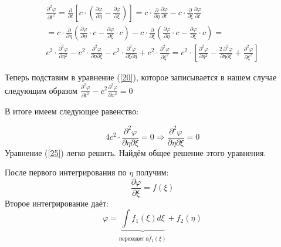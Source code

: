 \documentclass[14pt,a4paper,oneside]{extarticle}	%
\begin{document}
 \begin{eqnarray*}
\frac{\partial^{2} \varphi}{\partial t^{2}} = \frac{\partial}{\partial t}\left[ c \cdot \left( \frac{\partial \varphi}{\partial \eta} - \frac{\partial \varphi}{\partial \xi} \right)\right]  = c \cdot \frac{\partial }{\partial \eta}\frac{\partial \varphi}{\partial t} - c\cdot \frac{\partial}{\partial \xi}\frac{\partial \varphi}{\partial t} \\
= c\cdot \frac{\partial }{\partial \eta} \left( \frac{\partial \varphi}{\partial \eta}\cdot c -  \frac{\partial \varphi}{\partial \xi}\cdot c \right) - c\cdot \frac{\partial }{\partial \xi} \left( \frac{\partial \varphi}{\partial \eta}\cdot c - \frac{\partial \varphi}{\partial \xi} \cdot c \right) = \\
c^{2}\cdot\frac{\partial^{2} \varphi}{\partial \eta^{2}} - c^{2}\cdot \frac{\partial^{2} \varphi}{\partial \eta \partial \xi} - c^{2}\cdot \frac{\partial^{2} \varphi}{\partial \xi \partial \eta} + c^{2}\cdot \frac{\partial^{2} \varphi}{\partial \xi^{2}} = 
c^{2}\cdot \left[ \frac{\partial^{2} \varphi}{\partial \eta^{2}} - \frac{2\:\partial^{2} \varphi}{\partial \eta \partial \xi} +  \frac{\partial^{2} \varphi}{\partial \xi^{2}}\right] 
\end{eqnarray*}

Теперь подставим в уравнение (\ref{20}), которое записывается в нашем случае следующим образом $ \frac{\partial^{2} \varphi}{\partial t^{2}} - c^{2} \frac{\partial^{2} \varphi}{\partial x^{2}} = 0 $

В итоге имеем следующее равенство:

\begin{equation}\label{25}
4c^{2}\cdot \frac{\partial^{2} \varphi}{\partial \eta \partial \xi} = 0 \Rightarrow \frac{\partial^{2} \varphi}{\partial \eta \partial \xi} = 0
\end{equation}
Уравнение (\ref{25}) легко решить.
Найдём общее решение этого уравнения.

После первого интегрирования по $ \eta $ получим:
\begin{equation*}
\frac{\partial \varphi}{\partial \xi} = f(\xi)
\end{equation*}
Второе интегрирование даёт:
\begin{equation*}
\varphi = \underbrace{\int f_{1}(\xi)d\xi}_{\text{переходит в}\tilde{f_{1}}(\xi)} + f_{2}(\eta)
\end{equation*}
\end{document}
